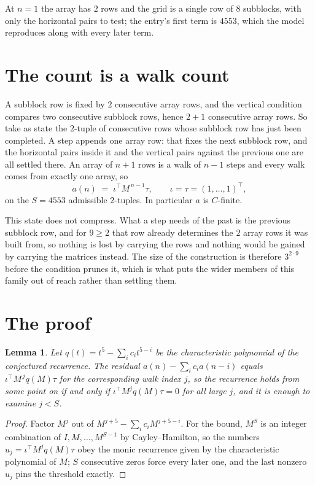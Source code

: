 \documentclass[11pt,a4paper]{article}
\theoremstyle{plain}
\newtheorem{lemma}[theorem]{Lemma}
\theoremstyle{definition}
\begin{document}
At $n=1$ the array has $2$ rows and the grid is a single row of $8$
subblocks, with only the horizontal pairs to test; the entry's first term is
$4553$, which the model reproduces along with every later term.

\section{The count is a walk count}

A subblock row is fixed by $2$ consecutive array rows, and the vertical condition compares
two consecutive subblock rows, hence $2+1$ consecutive array rows. So take as state the
$2$-tuple of consecutive rows whose subblock row has just been completed. A step appends one
array row: that fixes the next subblock row, and the horizontal pairs inside it and the
vertical pairs against the previous one are all settled there. An array of $n+1$ rows is
a walk of $n-1$ steps and every walk comes from exactly one array, so
\[
a(n)\;=\;\iota^{\!\top}M^{\,n-1}\tau,\qquad\iota=\tau=(1,\dots,1)^{\!\top},
\]
on the $S=4553$ admissible $2$-tuples. In particular $a$ is $C$-finite.

This state does not compress. What a step needs of the past is the previous subblock row, and
for $9\ge2$ that row already determines the $2$ array rows it was built from, so nothing
is lost by carrying the rows and nothing would be gained by carrying the matrices instead. The
size of the construction is therefore $3^{2\cdot9}$ before the condition prunes
it, which is what puts the wider members of this family out of reach rather than settling them.

\section{The proof}

\begin{lemma}\label{lem:crit}
Let $q(t)=t^{5}-\sum_i c_it^{5-i}$ be the characteristic polynomial of the
conjectured recurrence. The residual $a(n)-\sum_ic_ia(n-i)$ equals
$\iota^{\!\top}M^{\,j}q(M)\tau$ for the corresponding walk index $j$, so the recurrence
holds from some point on if and only if $\iota^{\!\top}M^{j}q(M)\tau=0$ for all large $j$,
and it is enough to examine $j<S$.
\end{lemma}

\begin{proof}
Factor $M^{j}$ out of $M^{j+5}-\sum_ic_iM^{j+5-i}$. For the bound, $M^{S}$
is an integer combination of $I,M,\dots,M^{S-1}$ by Cayley--Hamilton, so the numbers
$u_j=\iota^{\!\top}M^{j}q(M)\tau$ obey the monic recurrence given by the characteristic
polynomial of $M$; $S$ consecutive zeros force every later one, and the last nonzero $u_j$
pins the threshold exactly.
\end{proof}
\end{document}

